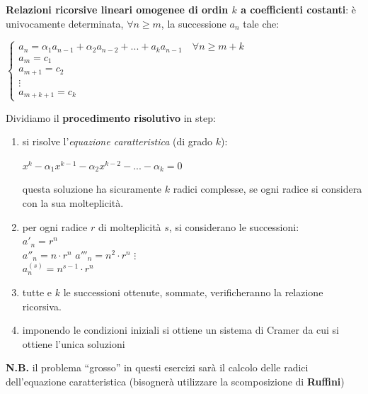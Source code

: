 \begin{flushleft}
    \textbf{Relazioni ricorsive lineari omogenee di ordin $k$ a coefficienti costanti}: è univocamente determinata, $\forall n \geq m$, la successione $a_n$ tale che:

    {\centering
        $\begin{cases}
            a_n = \alpha_1 a_{n-1} + \alpha_2 a_{n-2} + ... + a_k a_{n-1} \quad \forall n \geq m + k \\
            a_m = c_1 \\
            a_{m+1} = c_2 \\
            \vdots \\
            a_{m+k+1} = c_k 
        \end{cases}$
    \par}

    Dividiamo il \textbf{procedimento risolutivo} in step:
    \begin{enumerate}[nosep]
        \item si risolve l'\textit{equazione caratteristica} (di grado $k$):

        {\centering
            $x^k - \alpha_1 x^{k-1} - \alpha_2 x^{k-2} - ... - \alpha_k = 0$
        \par}
        questa soluzione ha sicuramente $k$ radici complesse, se ogni radice si considera con la sua molteplicità.
        \item per ogni radice $r$ di molteplicità $s$, si considerano le successioni: \\
        $a'_n = r^n$ \\
        $a''_n = n \cdot r^n$
        $a'''_n = n^2 \cdot r^n$
        $\vdots$ \\
        $a_n^{(s)} = n^{s-1} \cdot r^n$
        \item tutte e $k$ le successioni ottenute, sommate, verificheranno la relazione ricorsiva.
        \item imponendo le condizioni iniziali si ottiene un sistema di Cramer da cui si ottiene l'unica soluzioni
    \end{enumerate}
    \textbf{N.B.} il problema ``grosso'' in questi esercizi sarà il calcolo delle radici dell'equazione caratteristica (bisognerà utilizzare la scomposizione di \textbf{Ruffini})


\end{flushleft}
